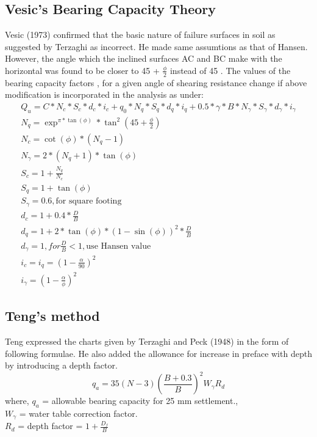 \subsection{Vesic's Bearing Capacity Theory}
Vesic (1973) confirmed that the basic nature of failure surfaces in soil as suggested by Terzaghi as incorrect. He made same assumtions as that of Hansen.  However, the angle which the inclined surfaces AC and BC make with the horizontal was found to be closer to 45 + $\frac{\phi}{2}$ instead of 45 . The values of the bearing capacity factors , for a given angle of shearing resistance change if above modification is incorporated in the analysis as under: \cite{arora_soil_2004}
\begin{gather}
Q_u = C * N_c * S_c * d_c * i_c + q_0 * N_q * S_q * d_q * i_q + 0.5 * {\gamma} * B * N_{\gamma}*S_{\gamma}*d_{\gamma} * i_{\gamma}\\
N_q = \exp^{\pi * \tan(\phi)} * \tan^2 ( 45 + \frac{\phi}{2} )\\
N_c = \cot(\phi)*(N_q - 1)\\
N_{\gamma} = 2 * (N_q+1) * \tan(\phi)\\
S_c = 1 + \frac{N_q}{N_c}\\
S_q = 1+ \tan(\phi)\\
S_{\gamma} = 0.6, \text{for square footing}\\
d_c=1+0.4*\frac{D}{B}\\
d_q= 1 + 2 * \tan(\phi)*(1-\sin(\phi) )^2*\frac{D}{B}\\
d_{\gamma} = 1 , for \frac{D}{B}<1 , \text{use Hansen value}\\
i_c=i_q = (1-\frac{\alpha}{90})^2\\
i_{\gamma}=(1-\frac{\alpha}{\phi})^2
\end{gather}

\subsection{Teng's method}
Teng expressed the charts given by Terzaghi and Peck (1948) in the form of following formulae. He also added the allowance for increase in preface with depth by introducing a depth factor.
\begin{equation}
q_a = 35 (N-3) (\frac{B+0.3}{B})^2 W_\gamma R_d
\end{equation}
where,
$q_a$ = allowable bearing capacity for 25 mm settlement.,\\
$W_\gamma$ = water table correction factor.\\
$R_d$ = depth factor = $1 + \frac{D_f}{B}$

